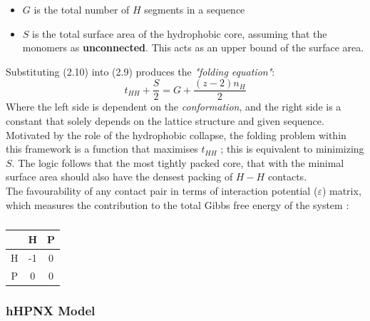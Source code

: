 \begin{itemize}
    \item $G$ is the total number of $H$ segments in a sequence
    \item $S$ is the total surface area of the hydrophobic core, assuming that
        the monomers as \textbf{unconnected}. This acts as an upper bound of the surface
        area.
\end{itemize}

Substituting (2.10) into (2.9) produces the \emph{"folding equation"}:
\begin{equation}
    t_{HH} + \frac{S}{2} = G + \frac{(z-2)n_H}{2}
\end{equation}
Where the left side is dependent on the \emph{conformation}, and the right
side is a constant that solely depends on the lattice structure and given sequence.
Motivated by the role of the hydrophobic collapse, the folding problem within this
framework is a function that maximises $t_{HH}$ ; this is equivalent to
minimizing $S$. The logic follows that the most tightly packed core, that with the minimal
surface area should also have the densest packing of $H-H$ contacts. \\

The favourability of any contact pair in terms of interaction potential ($\varepsilon$) matrix, which measures
the contribution to the total Gibbs free energy of the system \cite{Hoque}:
\begin{table}[!htb]
    \begin{center}
        \caption{}
        \begin{tabular}{|c || c | c|}
            \hline
             & H & P \\
            \hline
            H & -1 & 0 \\
            \hline
            P & 0 & 0 \\
            \hline
        \end{tabular}
    \end{center}
\end{table}

\subsubsection{hHPNX Model}
